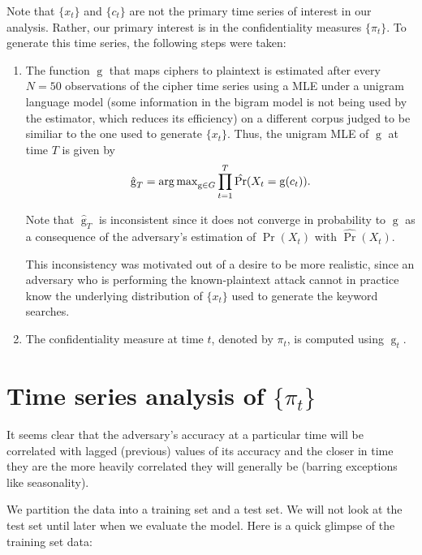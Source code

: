 \documentclass[final,
  11pt,
]{article}
\begin{document}
Note that \(\{x_t\}\) and \(\{c_t\}\) are not the primary time series of
interest in our analysis. Rather, our primary interest is in the
confidentiality measures \(\{\pi_t\}\). To generate this time series,
the following steps were taken:

\begin{enumerate}
\item The function $\operatorname{g}$ that maps ciphers to plaintext is
estimated after every $N=50$ observations of the cipher time series using a
MLE under a unigram language model (some information in the bigram model is not
being used by the estimator, which reduces its efficiency) on a different corpus
judged to be similiar to the one used to generate $\{x_t\}$.
Thus, the unigram MLE of $\operatorname{g}$ at time $T$ is given by
$$
    \hat{\operatorname{g}}_T = \operatorname{arg\,max}_{\operatorname{g} \in G}
    \prod_{t=1}^{T} \hat{\Pr}(X_t = \operatorname{g}(c_t)).
$$

Note that $\hat{\operatorname{g}}_T$ is inconsistent since it does not converge
in probability to $\operatorname{g}$ as a consequence of the adversary's
estimation of $\Pr(X_t)$ with $\hat{\Pr}(X_t)$.

This inconsistency was motivated out of a desire to be more realistic, since an
adversary who is performing the known-plaintext attack cannot in practice know
the underlying distribution of $\{x_t\}$ used to generate the keyword searches.
\item The confidentiality measure at time $t$, denoted by $\pi_t$, is computed
using $\hat{\operatorname{g}}_{t}$.
\end{enumerate}

\hypertarget{time-series-analysis-of-pi_t}{%
\section{\texorpdfstring{Time series analysis of
\(\{\pi_t\}\)}{Time series analysis of \textbackslash\{\textbackslash pi\_t\textbackslash\}}}\label{time-series-analysis-of-pi_t}}

It seems clear that the adversary's accuracy at a particular time will
be correlated with lagged (previous) values of its accuracy and the
closer in time they are the more heavily correlated they will generally
be (barring exceptions like seasonality).

We partition the data into a training set and a test set. We will not
look at the test set until later when we evaluate the model. Here is a
quick glimpse of the training set data:
\end{document}
